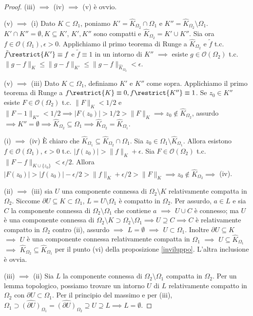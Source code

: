 \begin{proof}
  (iii) $\implies$ (iv) $\implies$ (v) è ovvio.

  (v) $\implies$ (i) Dato $K \subset \Omega_1$, poniamo $K'=\widehat{K}_{\Omega_2} \cap \Omega_1$ e $K''=\widehat{K}_{\Omega_2} \setminus \Omega_1$. $K' \cap K''=\emptyset, K \subseteq K'$, $K', K''$ sono compatti e $\widehat{K}_{\Omega_2}=K'\cup K''$.
  Sia ora $f \in \mathcal{O}(\Omega_1), \epsilon>0$. Applichiamo il primo teorema di Runge a $\widehat{K}_{\Omega_2}$ e $\tilde{f}$ t.c. $\tilde{f}\restrict{K'}\equiv f$ e $\tilde{f}\equiv 1$ in un intorno di $K''$ $\implies$ esiste $g \in \mathcal{O}(\Omega_2)$ t.c. $\|g-f\|_K \le \|g-f\|_{K'} \le \|g-f\|_{\widehat{K}_{\Omega_2}}<\epsilon$.

  (v) $\implies$ (iii) Dato $K \subset \Omega_1$, definiamo $K'$ e $K''$ come sopra. Applichiamo il primo teorema di Runge a $f\restrict{K} \equiv 0, f\restrict{K''}\equiv 1$.
  Se $z_0 \in K''$ esiste $F \in \mathcal{O}(\Omega_2)$ t.c. $\|F\|_K<1/2$ e $\|F-1\|_{K''}<1/2 \implies |F(z_0)|>1/2>\|F\|_K \implies z_0 \not\in \widehat{K}_{\Omega_2}$, assurdo $\implies K''=\emptyset \implies \widehat{K}_{\Omega_2} \subseteq \Omega_1 \implies \widehat{K}_{\Omega_2}=\widehat{K}_{\Omega_1}$.

  (i) $\implies$ (iv) È chiaro che $\widehat{K}_{\Omega_1} \subseteq \widehat{K}_{\Omega_2} \cap \Omega_1$. Sia $z_0 \in \Omega_1 \setminus \widehat{K}_{\Omega_1}$.
  Allora esistono $f \in \mathcal{O}(\Omega_1)$, $\epsilon>0$ t.c. $|f(z_0)|>\|f\|_K+\epsilon$. Sia $F \in \mathcal{O}(\Omega_2)$ t.c. $\|F-f\|_{K \cup \{z_0\}}<\epsilon/2$.
  Allora $|F(z_0)|>|f(z_0)|-\epsilon/2>\|f\|_K+\epsilon/2>\|F\|_K \implies z_0 \not\in \widehat{K}_{\Omega_2} \implies$ (iv).

  (ii) $\implies$ (iii) sia $U$ una componente connessa di $\Omega_2 \setminus K$ relativamente compatta in $\Omega_2$. Siccome $\partial U \subseteq K \subset \Omega_1$, $L=U \setminus \Omega_1$ è compatto in $\Omega_2$.
  Per assurdo, $a \in L$ e sia $C$ la componente connessa di $\Omega_2 \setminus \Omega_1$ che contiene $a$ $\implies$ $U \cup C$ è connesso; ma $U$ è una componente connessa di $\Omega_2 \setminus K \supset \Omega_2 \setminus \Omega_1 \implies U \supseteq C \implies C$ è relativamente compatto in $\Omega_2$ contro (ii), assurdo $\implies$ $L=\emptyset$ $\implies$ $U \subset \Omega_1$.
  Inoltre $\partial U \subseteq K$ $\implies$ $U$ è una componente connessa relativamente compatta in $\Omega_1$ $\implies$ $U \subseteq \widehat{K}_{\Omega_1}$ $\implies$ $\widehat{K}_{\Omega_2} \subseteq \widehat{K}_{\Omega_1}$ per il punto (vi) della proposizione \ref{inviluppo}. L'altra inclusione è ovvia.

  (iii) $\implies$ (ii) Sia $L$ la componente connessa di $\Omega_2 \setminus \Omega_1$ compatta in $\Omega_2$. Per un lemma topologico, possiamo trovare un intorno $U$ di $L$ relativamente compatto in $\Omega_2$ con $\partial U \subset \Omega_1$. Per il principio del massimo e per (iii), $\Omega_1 \supset \widehat{(\partial U)}_{\Omega_1}=\widehat{(\partial U)}_{\Omega_2} \supseteq U \supseteq L \implies L=\emptyset$.
\end{proof}

